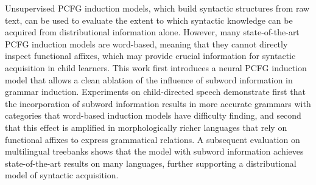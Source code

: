 Unsupervised PCFG induction models, which build syntactic structures from raw text, can be used to evaluate the extent to which syntactic knowledge can be acquired from distributional information alone. However, many state-of-the-art PCFG induction models are word-based, meaning that they cannot directly inspect functional affixes, which may provide crucial information for syntactic acquisition in child learners. This work first introduces a neural PCFG induction model that allows a clean ablation of the influence of subword information in grammar induction. Experiments on child-directed speech demonstrate first that the incorporation of subword information results in more accurate grammars with categories that word-based induction models have difficulty finding, and second that this effect is amplified in morphologically richer languages that rely on functional affixes to express grammatical relations. A subsequent evaluation on multilingual treebanks shows that the model with subword information achieves state-of-the-art results on many languages, further supporting a distributional model of syntactic acquisition.
